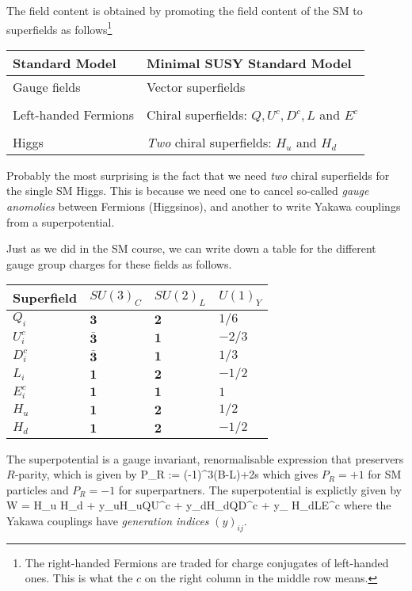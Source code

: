 The field content is obtained by promoting the field content of the SM to superfields as follows\footnote{The right-handed Fermions are traded for charge conjugates of left-handed ones. This is what the $c$ on the right column in the middle row means.} 

\begin{center}
	\begin{tabular}{@{} C{7cm} C{7cm}  @{}}
		\toprule
		Standard Model & Minimal SUSY Standard Model \\
		\midrule 
		Gauge fields & Vector superfields \\ \\
		Left-handed Fermions & Chiral superfields: $Q, U^c, D^c, L$ and $E^c$ \\ \\
		Higgs & \textit{Two} chiral superfields: $H_u$ and $H_d$ \\
		\bottomrule
	\end{tabular}
\end{center}

Probably the most surprising is the fact that we need \textit{two} chiral superfields for the single SM Higgs. This is because we need one to cancel so-called \textit{gauge anomolies} between Fermions (Higgsinos), and another to write Yakawa couplings from a superpotential. 

Just as we did in the SM course, we can write down a table for the different gauge group charges for these fields as follows. 

\begin{center}
	\begin{tabular}{@{} C{3cm} C{2cm} C{2cm} C{2cm} @{}}
		\toprule
		Superfield & $SU(3)_C$ & $SU(2)_L$ & $U(1)_Y$ \\
		\midrule 
		$Q_i$ & $\mathbf{3}$ & $\mathbf{2}$ & $1/6$ \\ 
		$U^c_i$ & $\mathbf{\bar{3}}$ & $\mathbf{1}$ & $-2/3$ \\ 
		$D^c_i$ & $\mathbf{\bar{3}}$ & $\mathbf{1}$ & $1/3$ \\ 
		$L_i$ & $\mathbf{1}$ & $\mathbf{2}$ & $-1/2$ \\ 
		$E^c_i$ & $\mathbf{1}$ & $\mathbf{1}$ & $1$ \\ 
		$H_u$ & $\mathbf{1}$ & $\mathbf{2}$ & $1/2$ \\ 
		$H_d$ & $\mathbf{1}$ & $\mathbf{2}$ & $-1/2$ \\ 
		\bottomrule
	\end{tabular}
\end{center}

The superpotential is a gauge invariant, renormalisable expression that preservers $R$-parity, which is given by 
\bse 
    P_R := (-1)^{3(B-L)+2s} 
\ese 
which gives $P_R=+1$ for SM particles and $P_R = -1$ for superpartners. The superpotential is explictly given by 
\bse 
    W = \mu H_u H_d + y_uH_uQU^c + y_dH_dQD^c + y_{\ell} H_dLE^c
\ese 
where the Yakawa couplings have \textit{generation indices} $(y)_{ij}$. 